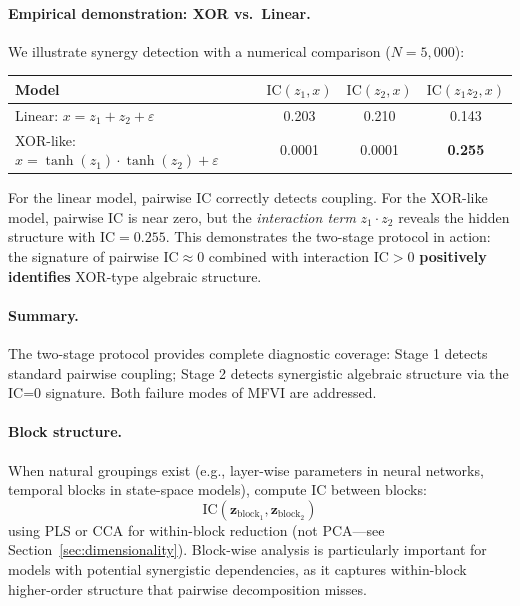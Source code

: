 \documentclass[10pt]{article} %
\theoremstyle{plain}
\theoremstyle{definition}
\newcommand{\IC}{\mathrm{IC}}  %
\begin{document}
\paragraph{Empirical demonstration: XOR vs.\ Linear.} We illustrate synergy detection with a numerical comparison ($N = 5{,}000$):

\begin{center}
\begin{tabular}{lccc}
\toprule
\textbf{Model} & $\IC(z_1, x)$ & $\IC(z_2, x)$ & $\IC(z_1 z_2, x)$ \\
\midrule
Linear: $x = z_1 + z_2 + \varepsilon$ & 0.203 & 0.210 & 0.143 \\
XOR-like: $x = \tanh(z_1) \cdot \tanh(z_2) + \varepsilon$ & 0.0001 & 0.0001 & \textbf{0.255} \\
\bottomrule
\end{tabular}
\end{center}

For the linear model, pairwise IC correctly detects coupling. For the XOR-like model, pairwise IC is near zero, but the \emph{interaction term} $z_1 \cdot z_2$ reveals the hidden structure with $\IC = 0.255$. This demonstrates the two-stage protocol in action: the signature of pairwise $\IC \approx 0$ combined with interaction $\IC > 0$ \textbf{positively identifies} XOR-type algebraic structure.

\paragraph{Summary.} The two-stage protocol provides complete diagnostic coverage: Stage 1 detects standard pairwise coupling; Stage 2 detects synergistic algebraic structure via the IC=0 signature. Both failure modes of MFVI are addressed.

\paragraph{Block structure.} When natural groupings exist (e.g., layer-wise parameters in neural networks, temporal blocks in state-space models), compute IC between blocks:
\begin{equation}
\IC(\mathbf{z}_{\text{block}_1}, \mathbf{z}_{\text{block}_2})
\end{equation}
using PLS or CCA for within-block reduction (not PCA---see Section~\ref{sec:dimensionality}). Block-wise analysis is particularly important for models with potential synergistic dependencies, as it captures within-block higher-order structure that pairwise decomposition misses.
\end{document}

